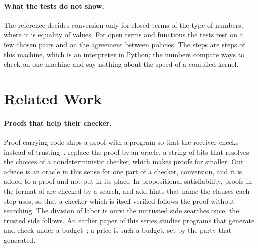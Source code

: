 \documentclass[acmsmall,nonacm,screen]{acmart}
\begin{document}
\paragraph{What the tests do not show.} The reference decides conversion only for closed
terms of the type of numbers, where it is equality of values. For open terms and functions
the tests rest on a few chosen pairs and on the agreement between policies. The steps are
steps of this machine, which is an interpreter in Python; the numbers compare ways to check
on one machine and say nothing about the speed of a compiled kernel.

\section{Related Work}
\label{sec:related}

\paragraph{Proofs that help their checker.} Proof-carrying code ships a proof with a program
so that the receiver checks instead of trusting~\cite{necula1997}. \citet{necula2001} replace
the proof by an oracle, a string of bits that resolves the choices of a nondeterministic
checker, which makes proofs far smaller. Our advice is an oracle in this sense for one part
of a checker, conversion, and it is added to a proof and not put in its place.
In propositional satisfiability, proofs in the format of \citet{wetzler2014} are checked by
a search, and \citet{cruzfilipe2017} add hints that name the clauses each step uses, so that
a checker which is itself verified follows the proof without searching. The division of labor is
ours: the untrusted side searches once, the trusted side follows. An earlier paper of this
series studies programs that generate and check under a budget~\cite{tpp3}; a price is such
a budget, set by the party that generated.
\end{document}
